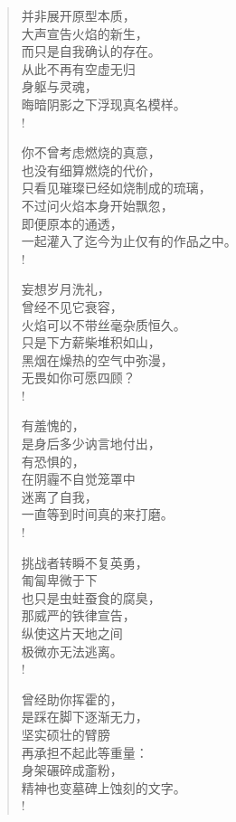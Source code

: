 \documentclass[UTF8, 12pt, a4paper]{ctexrep} %
\begin{document}
\begin{verse}
    并非展开原型本质，\\
    大声宣告火焰的新生，\\
    而只是自我确认的存在。\\
    从此不再有空虚无归\\
    身躯与灵魂，\\
    晦暗阴影之下浮现真名模样。\\!
    
    你不曾考虑燃烧的真意，\\
    也没有细算燃烧的代价，\\
    只看见璀璨已经如烧制成的琉璃，\\
    不过问火焰本身开始飘忽，\\
    即便原本的通透，\\
    一起灌入了迄今为止仅有的作品之中。\\!

    妄想岁月洗礼，\\
    曾经不见它衰容，\\
    火焰可以不带丝毫杂质恒久。\\
    只是下方薪柴堆积如山，\\
    黑烟在燥热的空气中弥漫，\\
    无畏如你可愿四顾？\\!

    有羞愧的，\\
    是身后多少讷言地付出，\\
    有恐惧的，\\
    在阴霾不自觉笼罩中\\
    迷离了自我，\\
    一直等到时间真的来打磨。\\!

    挑战者转瞬不复英勇，\\
    匍匐卑微于下\\
    也只是虫蛀蚕食的腐臭，\\
    那威严的铁律宣告，\\
    纵使这片天地之间\\
    极微亦无法逃离。\\!

    曾经助你挥霍的，\\
    是踩在脚下逐渐无力，\\
    坚实硕壮的臂膀\\
    再承担不起此等重量：\\
    身架碾碎成齑粉，\\
    精神也变墓碑上蚀刻的文字。\\!


\end{verse}
\end{document}
